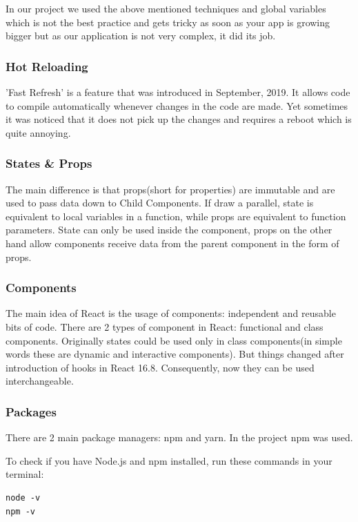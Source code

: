 In our project we used the above mentioned techniques and global variables which is not the best practice and gets tricky as soon as your app is growing bigger but as our application is not very complex, it did its job.


\subsubsection{Hot Reloading}
'Fast Refresh' is a feature that was introduced in September, 2019.
It allows code to compile automatically whenever changes in the code are made. 
Yet sometimes it was noticed that it does not pick up the changes and requires a reboot which is quite annoying.


\subsubsection{ States \& Props }
The main difference is that props(short for properties) are immutable and are used to pass data down to Child Components. 
If draw a parallel, state is equivalent to local variables in a function, while props are equivalent to function parameters.
State can only be used inside the component, props on the other hand allow components receive data from the parent component in the form of props.

\subsubsection{Components}
The main idea of React is the usage of components: independent and reusable bits of code.
There are 2 types of component in React: functional and class components. Originally states could be used only in class components(in simple words these are dynamic and interactive components). But things changed after introduction of hooks in React 16.8. Consequently, now they can be used interchangeable.

\subsubsection{Packages}
There are 2 main package managers: npm and yarn.
In the project npm was used.

To check if you have Node.js and npm installed, run these commands in your terminal:

\begin{lstlisting}
node -v
npm -v
\end{lstlisting}

